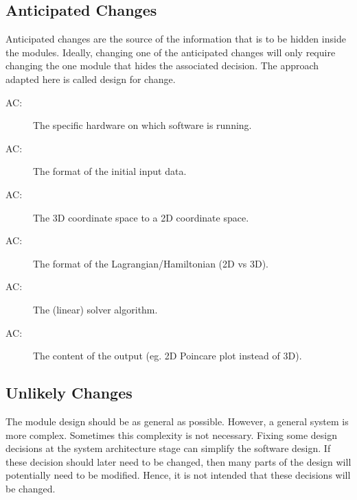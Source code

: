 \documentclass[12pt, titlepage]{article}
\newcounter{acnum}
\newcommand{\actheacnum}{AC\theacnum}
\begin{document}
\subsection{Anticipated Changes} \label{SecAchange}

Anticipated changes are the source of the information that is to be hidden
inside the modules. Ideally, changing one of the anticipated changes will only
require changing the one module that hides the associated decision. 
The approach adapted here is called design for change.

\begin{description}
\item[ \actheacnum \label{acHardware}:] The specific
  hardware on which \progname software is running.
\item[ \actheacnum \label{acFormat}:] The format of the
  initial input data.
\item[ \actheacnum \label{ac3d}:] The 3D coordinate space 
  to a 2D coordinate space.
\item[ \actheacnum \label{acCoord}:] The format of the
  Lagrangian/Hamiltonian (2D vs 3D).
\item[ \actheacnum \label{acLinear}:] The (linear)
  solver algorithm.
\item[ \actheacnum \label{acCont}:] The content of the
  output (eg. 2D Poincare plot instead of 3D).
\end{description}

\subsection{Unlikely Changes} \label{SecUchange}

The module design should be as general as possible. However, a general system 
is more complex. Sometimes this complexity is not necessary. Fixing some design
decisions at the system architecture stage can simplify the software design. If
these decision should later need to be changed, then many parts of the design
will potentially need to be modified. Hence, it is not intended that these
decisions will be changed.
\end{document}
